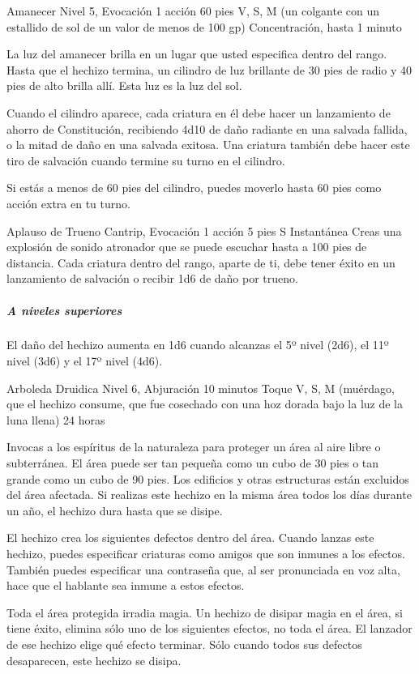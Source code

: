 \documentclass[a4paper,twocolumn,openany,10pt]{dndbook}
\begin{document}
\spellheader%
	{Amanecer}
	{Nivel 5, Evocación}
	{1 acción}
	{60 pies}
	{V, S, M (un colgante con un estallido de sol de un valor de menos de 100 gp)}
	{Concentración, hasta 1 minuto}
	
	La luz del amanecer brilla en un lugar que usted especifica dentro del rango. Hasta que el hechizo termina, un cilindro de
	luz brillante de 30 pies de radio y 40 pies de alto brilla allí. Esta luz es la luz del sol.
	
	Cuando el cilindro aparece, cada criatura en él debe hacer un lanzamiento de ahorro de Constitución, recibiendo 4d10 de daño
	radiante en una salvada fallida, o la mitad de daño en una salvada exitosa. Una criatura también debe hacer este tiro de
	salvación cuando termine su turno en el cilindro.
	
	Si estás a menos de 60 pies del cilindro, puedes moverlo hasta 60 pies como acción extra en tu turno. 

	\spellheader%
	{Aplauso de Trueno}
	{Cantrip, Evocación}
	{1 acción}
	{5 pies}
	{S}
	{Instantánea}
	Creas una explosión de sonido atronador que se puede escuchar hasta a 100 pies de distancia. Cada criatura dentro del rango,
	aparte de ti, debe tener éxito en un lanzamiento de salvación o recibir 1d6 de daño por trueno.

	\subparagraph{A niveles superiores}El daño del hechizo aumenta en 1d6 cuando alcanzas el 5º nivel (2d6), el 11º nivel (3d6)
	y el 17º nivel (4d6). 

\spellheader%
	{Arboleda Druidica}
	{Nivel 6, Abjuración}
	{10 minutos}
	{Toque}
	{V, S, M (muérdago, que el hechizo consume, que fue cosechado con una hoz dorada bajo la luz de la luna llena)}
	{24 horas}
	
	Invocas a los espíritus de la naturaleza para proteger un área al aire libre o subterránea. El área puede ser tan pequeña
	como un cubo de 30 pies o tan grande como un cubo de 90 pies. Los edificios y otras estructuras están excluidos del área
	afectada. Si realizas este hechizo en la misma área todos los días durante un año, el hechizo dura hasta que se disipe.
	
	El hechizo crea los siguientes defectos dentro del área. Cuando lanzas este hechizo, puedes especificar criaturas como
	amigos que son inmunes a los efectos. También puedes especificar una contraseña que, al ser pronunciada en voz alta, hace
	que el hablante sea inmune a estos efectos.
	
	Toda el área protegida irradia magia. Un hechizo de disipar magia en el área, si tiene éxito, elimina sólo uno de los
	siguientes efectos, no toda el área. El lanzador de ese hechizo elige qué efecto terminar. Sólo cuando todos sus defectos
	desaparecen, este hechizo se disipa.
\end{document}
